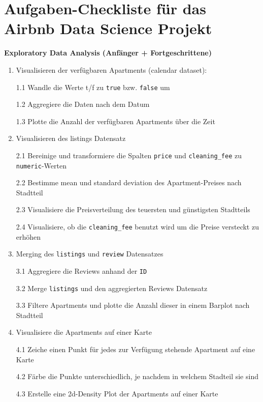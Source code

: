 \documentclass[
]{book}
\begin{document}
\hypertarget{aufgaben-checkliste-fuxfcr-das-airbnb-data-science-projekt}{%
\section{Aufgaben-Checkliste für das Airbnb Data Science Projekt}\label{aufgaben-checkliste-fuxfcr-das-airbnb-data-science-projekt}}

\textbf{Exploratory Data Analysis (Anfänger + Fortgeschrittene)}

\begin{enumerate}
\def\labelenumi{\arabic{enumi}.}
\item
  Visualisieren der verfügbaren Apartments (calendar dataset):

  1.1 Wandle die Werte t/f zu \texttt{true} bzw. \texttt{false} um

  1.2 Aggregiere die Daten nach dem Datum

  1.3 Plotte die Anzahl der verfügbaren Apartments über die Zeit
\item
  Visualisieren des listings Datensatz

  2.1 Bereinige und transformiere die Spalten \texttt{price} und \texttt{cleaning\_fee} zu \texttt{numeric}-Werten

  2.2 Bestimme mean und standard deviation des Apartment-Preises nach Stadtteil

  2.3 Visualisiere die Preisverteilung des teuersten und günstigsten Stadtteils

  2.4 Visualisiere, ob die \texttt{cleaning\_fee} benutzt wird um die Preise versteckt zu erhöhen
\item
  Merging des \texttt{listings} und \texttt{review} Datensatzes

  3.1 Aggregiere die Reviews anhand der \texttt{ID}

  3.2 Merge \texttt{listings} und den aggregierten Reviews Datensatz

  3.3 Filtere Apartments und plotte die Anzahl dieser in einem Barplot nach Stadtteil
\item
  Visualisiere die Apartments auf einer Karte

  4.1 Zeiche einen Punkt für jedes zur Verfügung stehende Apartment auf eine Karte

  4.2 Färbe die Punkte unterschiedlich, je nachdem in welchem Stadteil sie sind

  4.3 Erstelle eine 2d-Density Plot der Apartments auf einer Karte
\end{enumerate}
\end{document}
